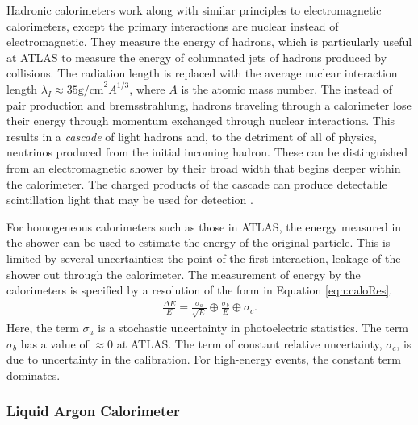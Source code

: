 Hadronic calorimeters work along with similar principles to electromagnetic calorimeters, except the primary interactions are nuclear instead of electromagnetic.
They measure the energy of hadrons, which is particularly useful at ATLAS to measure the energy of columnated jets of hadrons produced by collisions.
The radiation length is replaced with the average nuclear interaction length $\lambda_I\approx35\text{g/cm}^2A^{1/3}$, where $A$ is the atomic mass number.
The instead of pair production and bremsstrahlung, hadrons traveling through a calorimeter lose their energy through momentum exchanged through nuclear interactions.
This results in a \emph{cascade} of light hadrons and, to the detriment of all of physics, neutrinos produced from the initial incoming hadron.
These can be distinguished from an electromagnetic shower by their broad width that begins deeper within the calorimeter.
The charged products of the cascade can produce detectable scintillation light that may be used for detection  \cite{grupen}.


For homogeneous calorimeters such as those in ATLAS, the energy measured in the shower can be used to estimate the energy of the original particle.
This is limited by several uncertainties: the point of the first interaction, leakage of the shower out through the calorimeter.
The measurement of energy by the calorimeters is specified by a resolution of the form in Equation \ref{eqn:caloRes}.
\begin{equation}\begin{split}\label{eqn:caloRes}
    \frac{\Delta E}{E}=\frac{\sigma_a}{\sqrt{E}}\oplus\frac{\sigma_b}{E}\oplus\sigma_c.
\end{split}\end{equation}
Here, the term $\sigma_a$ is a stochastic uncertainty in photoelectric statistics.
The term $\sigma_b$ has a value of $\approx0$ at ATLAS.
The term of constant relative uncertainty, $\sigma_c$, is due to uncertainty in the calibration.
For high-energy events, the constant term dominates.

\subsubsection{Liquid Argon Calorimeter}

